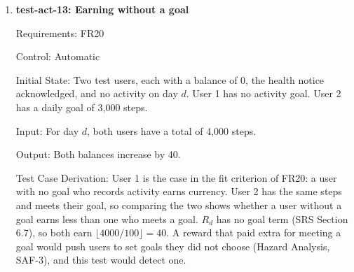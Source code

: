 \documentclass[12pt, titlepage]{article}
\begin{document}
\begin{enumerate}
Requirements: FR19

Control: Automatic

Initial State: A test user with a daily goal of 10,000 steps, a streak of 3,
the health notice acknowledged, and no activity on days $d$ and $d+1$.

Input: On day $d$, the user lowers the goal to 5,000 steps. The user then has
a total of 6,000 steps on each of days $d$ and $d+1$.

Output: The goal in effect is 10,000 steps on day $d$ and 5,000 steps on day
$d+1$. The streak is 0 at the end of day $d$ and 1 at the end of day $d+1$.

Test Case Derivation: FR19 applies a goal change from the next day, so the
goal in effect on day $d$ is still 10,000. Day $d$'s 6,000 steps miss it, so
day $d$ does not count toward the streak (SRS Section 6.7) and the streak
resets to 0. On day $d+1$, 6,000 steps meet the new goal of 5,000, so the
streak becomes 1. The daily total is between the old and new goals, so
whether each day counts shows which goal was in effect. The goal is lowered,
not raised, because applying changes from the next day is what stops a user
from lowering a goal to keep the current day's streak alive (Hazard Analysis,
SAF-4). The streak starts at 3 so that a change applied on the same day would
give a streak of 4 instead of 0.

How test will be performed: A pytest test sends the goal change and then the
day's total, moves the backend's clock to day $d+1$, sends that day's total,
and reads the goal in effect and the streak for each day through the API.

\item{\textbf{test-act-13: Earning without a goal}\\}

Requirements: FR20

Control: Automatic

Initial State: Two test users, each with a balance of 0, the health notice
acknowledged, and no activity on day $d$. User 1 has no activity goal. User 2
has a daily goal of 3,000 steps.

Input: For day $d$, both users have a total of 4,000 steps.

Output: Both balances increase by 40.

Test Case Derivation: User 1 is the case in the fit criterion of FR20: a user
with no goal who records activity earns currency. User 2 has the same steps
and meets their goal, so comparing the two shows whether a user without a goal
earns less than one who meets a goal. $R_d$ has no goal term (SRS Section
6.7), so both earn $\lfloor 4000 / 100 \rfloor = 40$. A reward that paid extra
for meeting a goal would push users to set goals they did not choose (Hazard
Analysis, SAF-3), and this test would detect one.


\end{enumerate}
\end{document}
